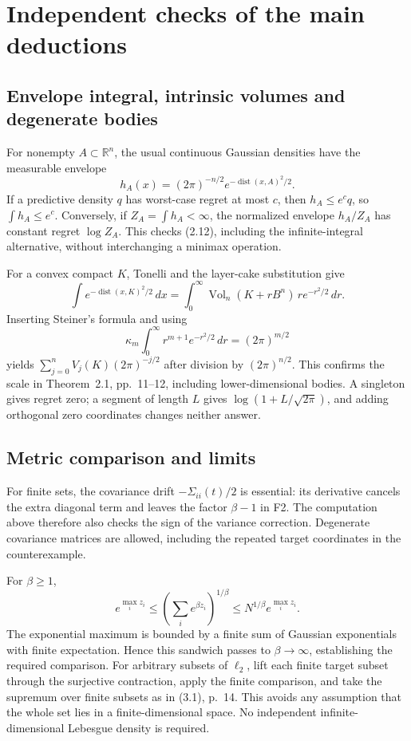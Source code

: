 \documentclass[10pt]{article}
\begin{document}
\section*{Independent checks of the main deductions}
\subsection*{Envelope integral, intrinsic volumes and degenerate bodies}
For nonempty \(A\subset\mathbb R^n\), the usual continuous Gaussian densities have the measurable envelope \[h_A(x)=(2\pi)^{-n/2}e^{-\operatorname{dist}(x,A)^2/2}.\] If a predictive density \(q\) has worst-case regret at most \(c\), then \(h_A\le e^c q\), so \(\int h_A\le e^c\). Conversely, if \(Z_A=\int h_A<\infty\), the normalized envelope \(h_A/Z_A\) has constant regret \(\log Z_A\). This checks (2.12), including the infinite-integral alternative, without interchanging a minimax operation.\par
For a convex compact \(K\), Tonelli and the layer-cake substitution give \[\int e^{-\operatorname{dist}(x,K)^2/2}\,dx
 =\int_0^\infty\operatorname{Vol}_n(K+rB^n)\,r e^{-r^2/2}\,dr.\] Inserting Steiner’s formula and using \[\kappa_m\int_0^\infty r^{m+1}e^{-r^2/2}\,dr=(2\pi)^{m/2}\] yields \(\sum_{j=0}^n V_j(K)(2\pi)^{-j/2}\) after division by \((2\pi)^{n/2}\). This confirms the scale in Theorem 2.1, pp. 11–12, including lower-dimensional bodies. A singleton gives regret zero; a segment of length \(L\) gives \(\log(1+L/\sqrt{2\pi})\), and adding orthogonal zero coordinates changes neither answer.\par
\subsection*{Metric comparison and limits}
For finite sets, the covariance drift \(-\Sigma_{ii}(t)/2\) is essential: its derivative cancels the extra diagonal term and leaves the factor \(\beta-1\) in F2. The computation above therefore also checks the sign of the variance correction. Degenerate covariance matrices are allowed, including the repeated target coordinates in the counterexample.\par
For \(\beta\ge1\), \[e^{\max_i z_i}\le\left(\sum_i e^{\beta z_i}\right)^{1/\beta}
 \le N^{1/\beta}e^{\max_i z_i}.\] The exponential maximum is bounded by a finite sum of Gaussian exponentials with finite expectation. Hence this sandwich passes to \(\beta\to\infty\), establishing the required comparison. For arbitrary subsets of \(\ell_2\), lift each finite target subset through the surjective contraction, apply the finite comparison, and take the supremum over finite subsets as in (3.1), p. 14. This avoids any assumption that the whole set lies in a finite-dimensional space. No independent infinite-dimensional Lebesgue density is required.\par
\end{document}
